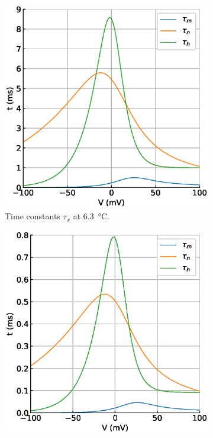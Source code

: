 \documentclass{scrartcl}			%
\begin{document}
\begin{figure}[H] 
  \begin{subfigure}[b]{0.5\linewidth}
    \centering
    \includegraphics[width=\linewidth]{imgs/timeConst_at_6.eps} 
    \caption{Time constants $\tau_x$ at \SI{6.3}{\celsius}.} 
    \label{fig:tc_63t} 
    \quad
  \end{subfigure}%
  \begin{subfigure}[b]{0.5\linewidth}
    \centering
    \includegraphics[width=\linewidth]{imgs/timeConst_at_28.eps} 

\end{subfigure}
\end{figure}
\end{document}
